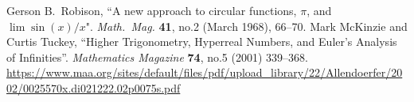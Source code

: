 \begin{thebibliography}{99}
 Gerson B.~Robison,
  ``A new approach to circular functions, $\pi$, and $\lim\sin(x)/x$".
  \textit{Math.\ Mag.} \textbf{41}, no.2 (March 1968), 66--70.\newline
{\tt{}}%
 Mark McKinzie and Curtis Tuckey,
  ``Higher Trigonometry, Hyperreal Numbers, and Euler's Analysis of Infinities''.
  \textit{Mathematics Magazine} \textbf{74}, no.5 (2001) 339--368.\newline
\url{https://www.maa.org/sites/default/files/pdf/upload_library/22/Allendoerfer/2002/0025570x.di021222.02p0075s.pdf}
\end{thebibliography}
